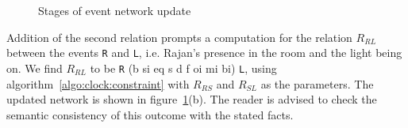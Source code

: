 \begin{figure}[htbp!]
	\caption{Stages of event network update}
	\label{fig:clock:Allen-algebra-example}
\end{figure}

Addition of the second relation prompts a computation for the relation $R_{RL}$ between the events \texttt{R} and \texttt{L}, i.e. 
Rajan's presence in the room and the light being on. We find $R_{RL}$ to be \texttt{R} (b si eq s d f oi mi bi) \texttt{L}, using 
algorithm~\ref{algo:clock:constraint} with $R_{RS}$ and $R_{SL}$ as the parameters. 
% 
% 
The updated network is shown in figure~\ref{fig:clock:Allen-algebra-example}(b). 
The reader is advised to check the semantic consistency of this outcome with the stated facts.

